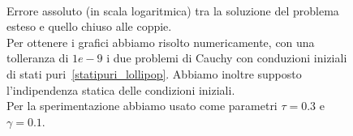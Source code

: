 \begin{figure}[!htb]
	\subfloat[][Nodo 1]
{\resizebox{0.45\textwidth}{!}{}}
 \quad 
\subfloat[][Nodo 2]
{\resizebox{0.45\textwidth}{!}{ }}
\\
\subfloat[][Nodo 3]
{\resizebox{0.45\textwidth}{!}
{}
}
\quad
\subfloat[][Nodo 4]
{\resizebox{0.45\textwidth}{!}
{}
}
\caption[Errori assoluti relativi al grafo~\ref{fig::lollipop} tra il modello esatto e quello chiuso alle coppie] {Errore assoluto (in scala logaritmica) tra la soluzione del problema esteso  e quello chiuso alle coppie.\\
Per ottenere i grafici abbiamo risolto numericamente, con una tolleranza di $1e-9$ i due problemi di Cauchy con conduzioni iniziali di stati puri~\eqref{statipuri_lollipop}. Abbiamo inoltre supposto l'indipendenza statica delle condizioni iniziali.\\
Per la sperimentazione abbiamo usato come parametri $\tau = 0.3$ e $\gamma = 0.1$.}
\label{fig::lollipop_errori_pair}

\end{figure}


 